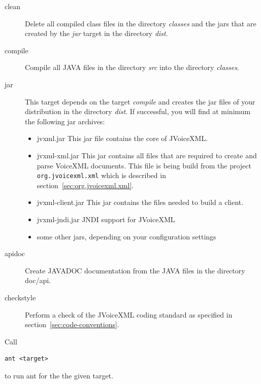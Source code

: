 \documentclass[11pt,a4paper]{article}
\begin{document}
\begin{description}
\item[clean]
Delete all compiled class files in the directory \emph{classes}
and the jars that are created by the \emph{jar} target in the directory 
\emph{dist}.

\item[compile]
 Compile all JAVA files in the directory \emph{src} into the directory
\emph{classes}.

\item[jar]
 This target depends on the target \emph{compile} and creates the jar
files of your distribution in the directory \emph{dist}.
If successful, you will find at minimum the following jar archives:
\begin{itemize}
\item jvxml.jar This jar file contains the core of JVoiceXML.
\item jvxml-xml.jar This jar contains all files that are required
to create and parse VoiceXML documents. This file is being build from the
project \texttt{org.jvoicexml.xml} which is described in
section~\ref{sec:org.jvoicexml.xml}.
\item jvxml-client.jar This jar contains the files needed to build
a client.
\item jvxml-jndi.jar JNDI support for JVoiceXML
\item some other jars, depending on your configuration settings
\end{itemize}

\item[apidoc]
Create JAVADOC documentation from the JAVA files in the directory
doc/api.
\item[checkstyle]
Perform a check of the JVoiceXML coding standard as specified 
in section~\ref{sec:code-conventions}.
\end{description}

Call
\begin{lstlisting}
ant <target>
\end{lstlisting}
to run ant for the the given target.
\end{document}
